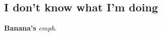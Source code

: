 \documentclass[12pt, a4paper, dutch]{article}
\begin{document}
\tableofcontents\newpage
\subsection{I don't know what I'm
doing}

\textbf{Banana's} \emph{emph}.
\end{document}
